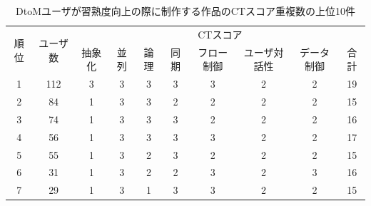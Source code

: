 \documentclass[11pt,dvipdfmx]{jreport}
\begin{document}
\begin{table}[]
\caption{DtoMユーザが習熟度向上の際に制作する作品のCTスコア重複数の上位10件}
  \label{tab:ranking-dtom}
  \vspace{2mm}
  \centering
\begin{tabular}{c|c|cccccccc}
\hline
\multirow{2}{*}{順位} & \multirow{2}{*}{ユーザ数} & \multicolumn{8}{c}{CTスコア}                                                                                                                                                         \\ \cline{3-10} 
                    &                      & \multicolumn{1}{c|}{抽象化} & \multicolumn{1}{c|}{並列} & \multicolumn{1}{c|}{論理} & \multicolumn{1}{c|}{同期} & \multicolumn{1}{c|}{フロー制御} & \multicolumn{1}{c|}{ユーザ対話性} & \multicolumn{1}{c|}{データ制御} & 合計 \\ \hline \hline
1                   & 112                  & \multicolumn{1}{c|}{3} & \multicolumn{1}{c|}{3} & \multicolumn{1}{c|}{3} & \multicolumn{1}{c|}{3} & \multicolumn{1}{c|}{3} & \multicolumn{1}{c|}{2} & \multicolumn{1}{c|}{2} & 19  \\ \hline
2                   & 84                  & \multicolumn{1}{c|}{1} & \multicolumn{1}{c|}{3} & \multicolumn{1}{c|}{3} & \multicolumn{1}{c|}{2} & \multicolumn{1}{c|}{2} & \multicolumn{1}{c|}{2} & \multicolumn{1}{c|}{2} & 15  \\ \hline
3                   & 74                  & \multicolumn{1}{c|}{1} & \multicolumn{1}{c|}{3} & \multicolumn{1}{c|}{3} & \multicolumn{1}{c|}{3} & \multicolumn{1}{c|}{2} & \multicolumn{1}{c|}{2} & \multicolumn{1}{c|}{2} & 16  \\ \hline
4                   & 56                  & \multicolumn{1}{c|}{1} & \multicolumn{1}{c|}{3} & \multicolumn{1}{c|}{3} & \multicolumn{1}{c|}{3} & \multicolumn{1}{c|}{3} & \multicolumn{1}{c|}{2} & \multicolumn{1}{c|}{2} & 17  \\ \hline
5                   & 55                  & \multicolumn{1}{c|}{1} & \multicolumn{1}{c|}{3} & \multicolumn{1}{c|}{2} & \multicolumn{1}{c|}{3} & \multicolumn{1}{c|}{2} & \multicolumn{1}{c|}{2} & \multicolumn{1}{c|}{2} & 15  \\ \hline
6                   & 31                   & \multicolumn{1}{c|}{1} & \multicolumn{1}{c|}{3} & \multicolumn{1}{c|}{2} & \multicolumn{1}{c|}{2} & \multicolumn{1}{c|}{3} & \multicolumn{1}{c|}{2} & \multicolumn{1}{c|}{3} & 16  \\ \hline
7                   & 29                   & \multicolumn{1}{c|}{1} & \multicolumn{1}{c|}{3} & \multicolumn{1}{c|}{1} & \multicolumn{1}{c|}{3} & \multicolumn{1}{c|}{3} & \multicolumn{1}{c|}{2} & \multicolumn{1}{c|}{2} & 15 \\ \hline

\end{tabular}
\end{table}
\end{document}
